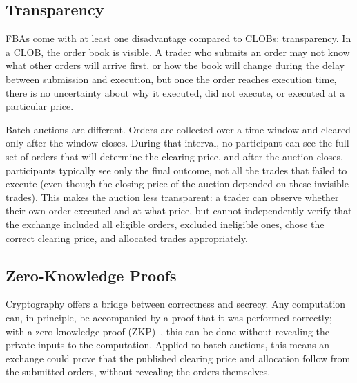 \documentclass[runningheads]{llncs}
\begin{document}

\subsection{Transparency} 

FBAs come with at least one disadvantage compared to CLOBs: transparency. In a CLOB, the order book is visible. A trader who submits an order may not know what other orders will arrive first, or how the book will change during the delay between submission and execution, but once the order reaches execution time, there is no uncertainty about why it executed, did not execute, or executed at a particular price.

Batch auctions are different. Orders are collected over a time window and cleared only after the window closes. During that interval, no participant can see the full set of orders that will determine the clearing price, and after the auction closes, participants typically see only the final outcome, not all the trades that failed to execute (even though the closing price of the auction depended on these invisible trades). This makes the auction less transparent: a trader can observe whether their own order executed and at what price, but cannot independently verify that the exchange included all eligible orders, excluded ineligible ones, chose the correct clearing price, and allocated trades appropriately.

\subsection{Zero-Knowledge Proofs}

Cryptography offers a bridge between correctness and secrecy. Any computation can, in principle, be accompanied by a proof that it was performed correctly; with a zero-knowledge proof (ZKP)~\cite{GMW86}, this can be done without revealing the private inputs to the computation. Applied to batch auctions, this means an exchange could prove that the published clearing price and allocation follow from the submitted orders, without revealing the orders themselves.
\end{document}
